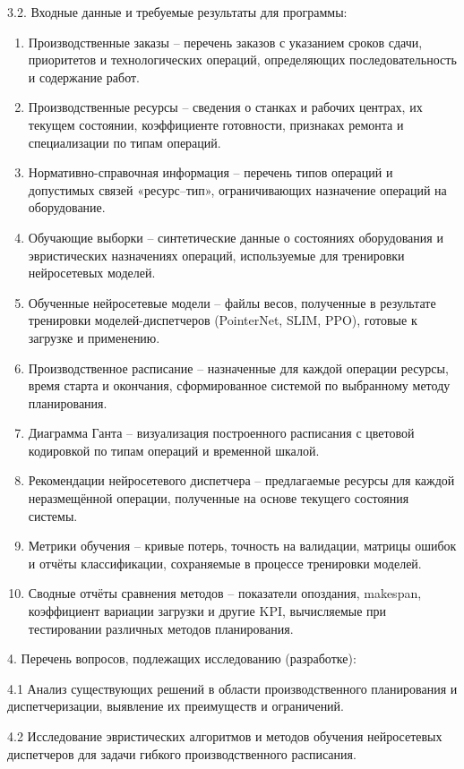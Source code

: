   3.2. Входные данные и требуемые результаты для программы:

\begin{enumerate}
\item Производственные заказы – перечень заказов с указанием сроков сдачи, приоритетов и технологических операций, определяющих последовательность и содержание работ.
\item Производственные ресурсы – сведения о станках и рабочих центрах, их текущем состоянии, коэффициенте готовности, признаках ремонта и специализации по типам операций.
\item Нормативно-справочная информация – перечень типов операций и допустимых связей «ресурс–тип», ограничивающих назначение операций на оборудование.
\item Обучающие выборки – синтетические данные о состояниях оборудования и эвристических назначениях операций, используемые для тренировки нейросетевых моделей.
\item Обученные нейросетевые модели – файлы весов, полученные в результате тренировки моделей-диспетчеров (PointerNet, SLIM, PPO), готовые к загрузке и применению.
\item Производственное расписание – назначенные для каждой операции ресурсы, время старта и окончания, сформированное системой по выбранному методу планирования.
\item Диаграмма Ганта – визуализация построенного расписания с цветовой кодировкой по типам операций и временной шкалой.
\item Рекомендации нейросетевого диспетчера – предлагаемые ресурсы для каждой неразмещённой операции, полученные на основе текущего состояния системы.
\item Метрики обучения – кривые потерь, точность на валидации, матрицы ошибок и отчёты классификации, сохраняемые в процессе тренировки моделей.
\item Сводные отчёты сравнения методов – показатели опоздания, makespan, коэффициент вариации загрузки и другие KPI, вычисляемые при тестировании различных методов планирования.
\end{enumerate}

{\parindent0pt

4. Перечень вопросов, подлежащих исследованию (разработке): }

  4.1  Анализ существующих решений в области производственного планирования и диспетчеризации, выявление их преимуществ и ограничений.

  4.2  Исследование эвристических алгоритмов и методов обучения нейросетевых диспетчеров для задачи гибкого производственного расписания.

